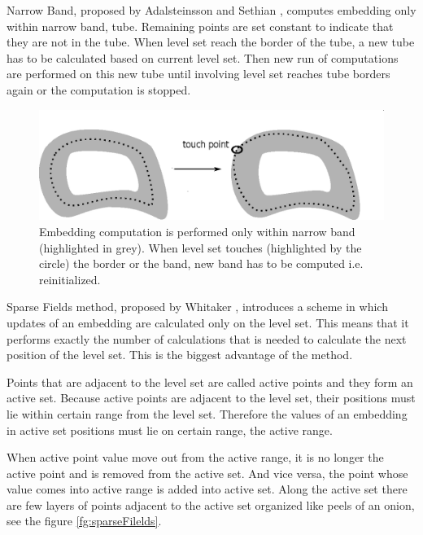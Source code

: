 \par
Narrow Band, proposed by Adalsteinsson and Sethian \cite{sethianFastLS}, computes embedding only within narrow band, tube.
Remaining points are set constant to indicate that they are not in the tube.
When level set reach the border of the tube, a new tube has to be calculated based on current level set.
Then new run of computations are performed on this new tube until involving level set reaches tube borders again or the computation is stopped.

\begin{figure}
    \centering
    \includegraphics[width=\textwidth]{data/narrowBands}
    \caption[Narrow band computation illustration]{Embedding computation is performed only within narrow band (highlighted in grey). When level set touches (highlighted by the circle) the border or the band, new band has to be computed i.e. reinitialized.}
    \label{fg:narrowBands}
\end{figure}

\par
Sparse Fields method, proposed by Whitaker \cite{sparseFilelds}, introduces a scheme in which updates of an embedding are calculated only on the level set.
This means that it performs exactly the number of calculations that is needed to calculate the next position of the level set.
This is the biggest advantage of the method.

\par
Points that are adjacent to the level set are called active points and they form an active set.
Because active points are adjacent to the level set, their positions must lie within certain range from the level set.
Therefore the values of an embedding in active set positions must lie on certain range, the active range.

\par
When active point value move out from the active range, it is no longer the active point and is removed from the active set.
And vice versa, the point whose value comes into active range is added into active set.
Along the active set there are few layers of points adjacent to the active set organized like peels of an onion, see the figure \ref{fg:sparseFilelds}.

